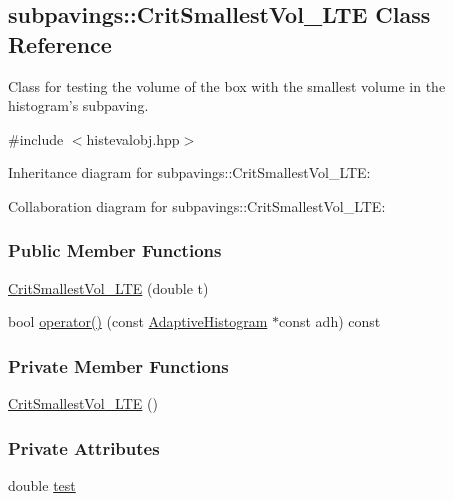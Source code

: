 \hypertarget{classsubpavings_1_1CritSmallestVol__LTE}{\subsection{subpavings\-:\-:\-Crit\-Smallest\-Vol\-\_\-\-L\-T\-E \-Class \-Reference}
\label{classsubpavings_1_1CritSmallestVol__LTE}
}


\-Class for testing the volume of the box with the smallest volume in the histogram's subpaving.  




{\ttfamily \#include $<$histevalobj.\-hpp$>$}



\-Inheritance diagram for subpavings\-:\-:\-Crit\-Smallest\-Vol\-\_\-\-L\-T\-E\-:


\-Collaboration diagram for subpavings\-:\-:\-Crit\-Smallest\-Vol\-\_\-\-L\-T\-E\-:
\subsubsection*{\-Public \-Member \-Functions}
\begin{DoxyCompactItemize}
\item 
\hyperlink{classsubpavings_1_1CritSmallestVol__LTE_a553cd69361518fbe49798993e640bc86}{\-Crit\-Smallest\-Vol\-\_\-\-L\-T\-E} (double t)
\item 
bool \hyperlink{classsubpavings_1_1CritSmallestVol__LTE_ab95576c1a6d7cf1f39ade29f44126212}{operator()} (const \hyperlink{classsubpavings_1_1AdaptiveHistogram}{\-Adaptive\-Histogram} $\ast$const adh) const 
\end{DoxyCompactItemize}
\subsubsection*{\-Private \-Member \-Functions}
\begin{DoxyCompactItemize}
\item 
\hyperlink{classsubpavings_1_1CritSmallestVol__LTE_ac5e228d5b9d2f5b6683eb1c2ab6e0359}{\-Crit\-Smallest\-Vol\-\_\-\-L\-T\-E} ()
\end{DoxyCompactItemize}
\subsubsection*{\-Private \-Attributes}
\begin{DoxyCompactItemize}
\item 
double \hyperlink{classsubpavings_1_1CritSmallestVol__LTE_a61b7e3a23025883c2726228f34bfbaf9}{test}
\end{DoxyCompactItemize}


